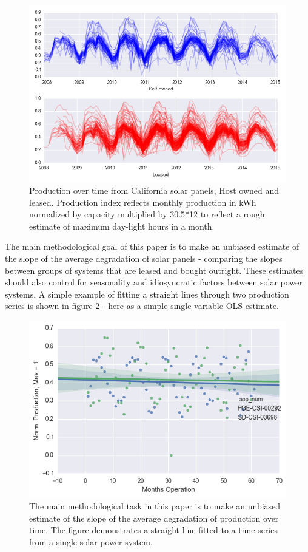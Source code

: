 \documentclass[12pt]{article}
\begin{document}
\begin{figure}
	\includegraphics[width=1\textwidth]{tot_production.png}
	\caption{Production over time from California solar panels, Host owned and leased. Production index reflects monthly production in kWh normalized by capacity multiplied by 30.5*12 to reflect a rough estimate of maximum day-light hours in a month.}
	\label{tot_production}
\end{figure}

The main methodological goal of this paper is to make an unbiased estimate of the slope of the average degradation of solar panels - comparing the slopes between groups of systems that are leased and bought outright. These estimates should also control for seasonality and idiosyncratic factors between solar power systems.
A simple example of fitting a straight lines through two production series is shown in figure \ref{example_prod} - here as a simple single variable OLS estimate.

\begin{figure}
	\includegraphics[width=1\textwidth]{example_prod.png}
	\caption{The main methodological task in this paper is to make an unbiased estimate of the slope of the average degradation of production over time. The figure demonstrates a straight line fitted to a time series from a single solar power system.}
	\label{example_prod}
\end{figure}
\end{document}
